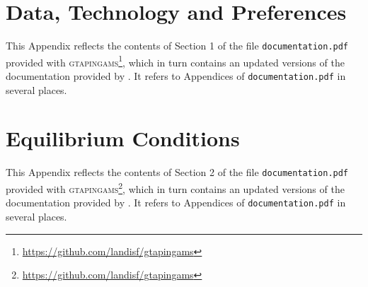 \documentclass{jgea}
\newcommand{\GTAPINGAMS}{\textsc{gtapingams}\xspace}
\newcommand{\DOCU}{\texttt{documentation.pdf}\xspace}
\newcommand{\GIGURL}{\url{https://github.com/landisf/gtapingams}}
\begin{document}
\newpage




\newpage
\begin{appendices}
\section{Data, Technology and Preferences}\label{model}
This Appendix reflects the contents of Section 1 of the file \DOCU
provided with \GTAPINGAMS\footnote{\GIGURL}, which in turn contains an
updated versions of the documentation provided by
\citet{LanzRutherford2016}.  It refers to Appendices of \DOCU in
several places.



\section[Equilibrium conditions]{Equilibrium Conditions}\label{equil}
This Appendix reflects the contents of Section 2 of the file \DOCU
provided with \GTAPINGAMS\footnote{\GIGURL}, which in turn contains an
updated versions of the documentation provided by
\citet{LanzRutherford2016}.  It refers to Appendices of \DOCU in
several places.




\end{appendices}
\end{document}
